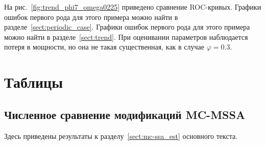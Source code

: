 \documentclass[specialist,
substylefile = spbu_report.rtx,
subf,href,colorlinks=true, 12pt]{disser}
\theoremstyle{definition}
\begin{document}
На рис.~\ref{fig:trend_phi7_omega0225} приведено сравнение ROC-кривых. Графики ошибок первого рода для этого примера можно найти в разделе~\ref{sect:periodic_case}. Графики ошибок первого рода для этого примера можно найти в разделе~\ref{sect:trend}. При оценивании параметров наблюдается потеря в мощности, но она не такая существенная, как в случае $\varphi=0.3$.

\chapter{Таблицы}
\section{Численное сравнение модификаций MC-MSSA}\label{appendix:mc-mssa_tables}
Здесь приведены результаты к разделу~\ref{sect:mc-ssa_est} основного текста.
\end{document}
